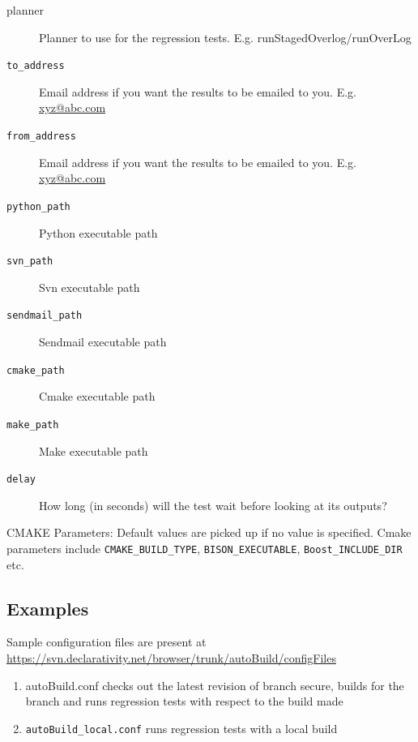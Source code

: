 \documentclass{article}
\begin{document}
\begin{description}
\item[planner] Planner to use for the regression
               tests. E.g. runStagedOverlog/runOverLog

\item[\texttt{to\_address}] Email address if you want the results to be emailed to
               you. E.g. \url{xyz@abc.com}

\item[\texttt{from\_address}] Email address if you want the results to be emailed
               to you. E.g. \url{xyz@abc.com}

\item[\texttt{python\_path}] Python executable path

\item[\texttt{svn\_path}] Svn executable path

\item[\texttt{sendmail\_path}] Sendmail executable path

\item[\texttt{cmake\_path}] Cmake executable path

\item[\texttt{make\_path}] Make executable path

\item[\texttt{delay}] How long (in seconds) will the test wait before looking at its outputs?

\end{description}

CMAKE Parameters: Default values are picked up if no value is
specified. Cmake parameters include \texttt{CMAKE\_BUILD\_TYPE}, \texttt{BISON\_EXECUTABLE},
\texttt{Boost\_INCLUDE\_DIR} etc.

\subsection{Examples}

Sample configuration files are present at
\url{https://svn.declarativity.net/browser/trunk/autoBuild/configFiles}

\begin{enumerate}
\item autoBuild.conf checks out the latest revision of branch secure,
builds for the branch and runs regression tests with respect to the
build made
\item \texttt{autoBuild\_local.conf} runs regression tests with a local
build
\end{enumerate}

 



 




\end{document}
